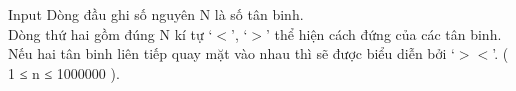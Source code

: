 Input
Dòng đầu ghi số nguyên N là số tân binh.   
\\   Dòng thứ hai gồm đúng N kí tự ‘$<$’, ‘$>$’ thể hiện cách đứng của các tân binh. Nếu hai tân binh liên tiếp quay mặt vào nhau thì sẽ được biểu diễn bởi ‘$>$$<$’. ( 1 ≤ n ≤ 1000000 ).